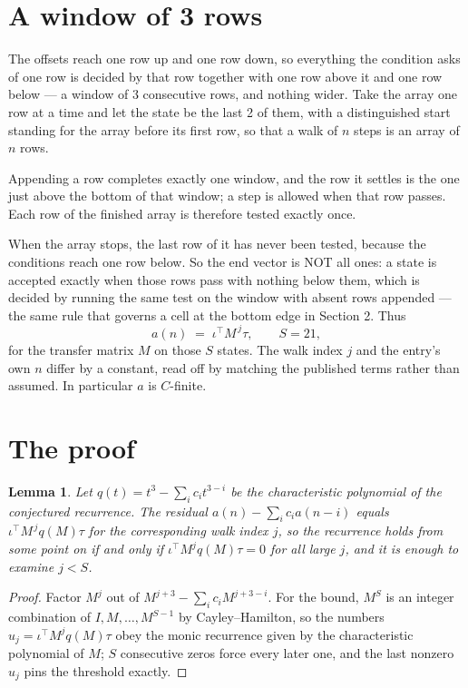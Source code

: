 \documentclass[11pt,a4paper]{article}
\theoremstyle{plain}
\newtheorem{lemma}[theorem]{Lemma}
\theoremstyle{definition}
\begin{document}
\section{A window of 3 rows}

The offsets reach one row up and one row down, so everything the condition asks of one row is
decided by that row together with one row above it and one row below --- a window of
$3$ consecutive rows, and nothing wider. Take the array one row at a time and
let the state be the last 2 of them, with a distinguished start standing for the array before its
first row, so that a walk of $n$ steps is an array of $n$ rows.

Appending a row completes exactly one window, and the row it settles is the one just above the bottom of that window; a step is
allowed when that row passes. Each row of the finished array is therefore tested exactly once.

When the array stops, the last row of it has never been tested, because the
conditions reach one row below. So the end vector is NOT all ones: a state is accepted exactly when
those rows pass with nothing below them, which is decided by running the same test on the window
with absent rows appended --- the same rule that governs a cell at the bottom edge in
Section 2.
Thus
\[
a(n)\;=\;\iota^{\!\top}M^{\,j}\tau ,\qquad S=21,
\]
for the transfer matrix $M$ on those $S$ states. The walk index $j$ and the entry's own $n$
differ by a constant, read off by matching the published terms rather than assumed. In
particular $a$ is $C$-finite.

\section{The proof}

\begin{lemma}\label{lem:crit}
Let $q(t)=t^{3}-\sum_i c_it^{3-i}$ be the characteristic polynomial of the
conjectured recurrence. The residual $a(n)-\sum_ic_ia(n-i)$ equals
$\iota^{\!\top}M^{\,j}q(M)\tau$ for the corresponding walk index $j$, so the recurrence
holds from some point on if and only if $\iota^{\!\top}M^{j}q(M)\tau=0$ for all large $j$,
and it is enough to examine $j<S$.
\end{lemma}

\begin{proof}
Factor $M^{j}$ out of $M^{j+3}-\sum_ic_iM^{j+3-i}$. For the bound, $M^{S}$
is an integer combination of $I,M,\dots,M^{S-1}$ by Cayley--Hamilton, so the numbers
$u_j=\iota^{\!\top}M^{j}q(M)\tau$ obey the monic recurrence given by the characteristic
polynomial of $M$; $S$ consecutive zeros force every later one, and the last nonzero $u_j$
pins the threshold exactly.
\end{proof}
\end{document}
